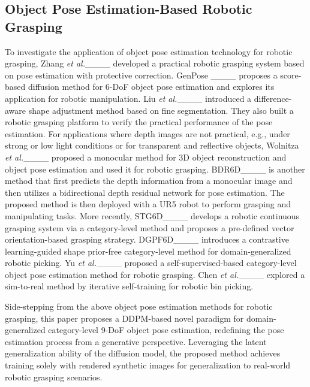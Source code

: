 \vspace{-1em}
\subsection{Object Pose Estimation-Based Robotic Grasping}
To investigate the application of object pose estimation technology for robotic grasping, Zhang \emph{et al.}____ developed a practical robotic grasping system based on pose estimation with protective correction. GenPose ____ proposes a score-based diffusion method for 6-DoF object pose estimation and explores its application for robotic manipulation. Liu \emph{et al.}____ introduced a difference-aware shape adjustment method based on fine segmentation. They also built a robotic grasping platform to verify the practical performance of the pose estimation. For applications where depth images are not practical, e.g., under strong or low light conditions or for transparent and reflective objects, Wolnitza \emph{et al.}____ proposed a monocular method for 3D object reconstruction and object pose estimation and used it for robotic grasping. BDR6D____ is another method that first predicts the depth information from a monocular image and then utilizes a bidirectional depth residual network for pose estimation. The proposed method is then deployed with a UR5 robot to perform grasping and manipulating tasks. More recently, STG6D____ develops a robotic continuous grasping system via a category-level method and proposes a pre-defined vector orientation-based grasping strategy. DGPF6D____ introduces a contrastive learning-guided shape prior-free category-level method for domain-generalized robotic picking. Yu \emph{et al.}____ proposed a self-supervised-based category-level object pose estimation method for robotic grasping. Chen \emph{et al.}____ explored a sim-to-real method by iterative self-training for robotic bin picking.

\par Side-stepping from the above object pose estimation methods for robotic grasping, this paper proposes a DDPM-based novel paradigm for domain-generalized category-level 9-DoF object pose estimation, redefining the pose estimation process from a generative perspective. Leveraging the latent generalization ability of the diffusion model, the proposed method achieves training solely with rendered synthetic images for generalization to real-world robotic grasping scenarios.

\vspace{-0.5em}